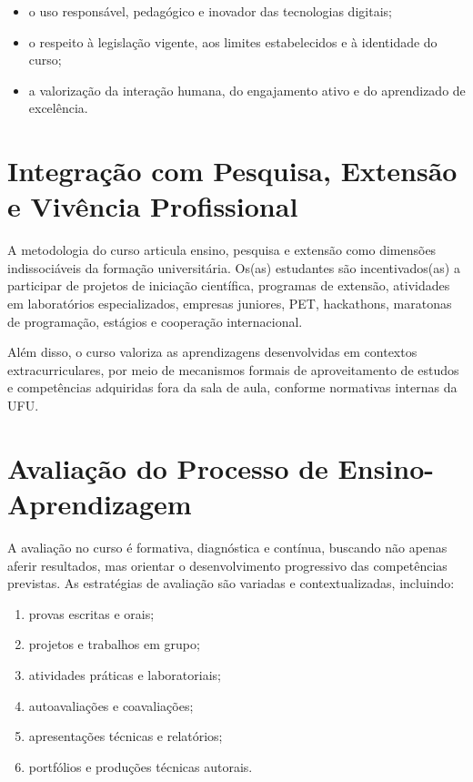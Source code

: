 \begin{itemize}
    \item o uso responsável, pedagógico e inovador das tecnologias digitais;
    \item o respeito à legislação vigente, aos limites estabelecidos e à identidade do curso;
    \item a valorização da interação humana, do engajamento ativo e do aprendizado de excelência.
\end{itemize}

\section{Integração com Pesquisa, Extensão e Vivência Profissional}

A metodologia do curso articula ensino, pesquisa e extensão como dimensões indissociáveis da formação universitária. Os(as) estudantes são incentivados(as) a participar de projetos de iniciação científica, programas de extensão, atividades em laboratórios especializados, empresas juniores, PET, hackathons, maratonas de programação, estágios e cooperação internacional.

Além disso, o curso valoriza as aprendizagens desenvolvidas em contextos extracurriculares, por meio de mecanismos formais de aproveitamento de estudos e competências adquiridas fora da sala de aula, conforme normativas internas da UFU.

\section{Avaliação do Processo de Ensino-Aprendizagem}

A avaliação no curso é formativa, diagnóstica e contínua, buscando não apenas aferir resultados, mas orientar o desenvolvimento progressivo das competências previstas. As estratégias de avaliação são variadas e contextualizadas, incluindo:

\begin{enumerate}
    \item provas escritas e orais;
    \item projetos e trabalhos em grupo;
    \item atividades práticas e laboratoriais;
    \item autoavaliações e coavaliações;
    \item apresentações técnicas e relatórios;
    \item portfólios e produções técnicas autorais.
\end{enumerate}

